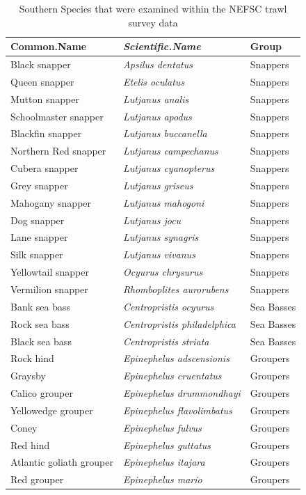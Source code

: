 \documentclass[
]{book}
\begin{document}
\begin{table}

\caption{\label{tab:southern}Southern Species that were examined within the NEFSC trawl survey data}
\centering
\begin{tabular}[t]{l>{\em}ll}
\toprule
Common.Name & Scientific.Name & Group\\
\midrule
Black snapper & Apsilus dentatus & Snappers\\
Queen snapper & Etelis oculatus & Snappers\\
Mutton snapper & Lutjanus analis & Snappers\\
Schoolmaster snapper & Lutjanus apodus & Snappers\\
Blackfin snapper & Lutjanus buccanella & Snappers\\
\addlinespace
Northern Red snapper & Lutjanus campechanus & Snappers\\
Cubera snapper & Lutjanus cyanopterus & Snappers\\
Grey snapper & Lutjanus griseus & Snappers\\
Mahogany snapper & Lutjanus mahogoni & Snappers\\
Dog snapper & Lutjanus jocu & Snappers\\
\addlinespace
Lane snapper & Lutjanus synagris & Snappers\\
Silk snapper & Lutjanus vivanus & Snappers\\
Yellowtail snapper & Ocyurus chrysurus & Snappers\\
Vermilion snapper & Rhomboplites aurorubens & Snappers\\
Bank sea bass & Centropristis ocyurus & Sea Basses\\
\addlinespace
Rock sea bass & Centropristis philadelphica & Sea Basses\\
Black sea bass & Centropristis striata & Sea Basses\\
Rock hind & Epinephelus adscensionis & Groupers\\
Graysby & Epinephelus cruentatus & Groupers\\
Calico grouper & Epinephelus drummondhayi & Groupers\\
\addlinespace
Yellowedge grouper & Epinephelus flavolimbatus & Groupers\\
Coney & Epinephelus fulvus & Groupers\\
Red hind & Epinephelus guttatus & Groupers\\
Atlantic goliath grouper & Epinephelus itajara & Groupers\\
Red grouper & Epinephelus mario & Groupers\\

\end{tabular}
\end{table}
\end{document}
